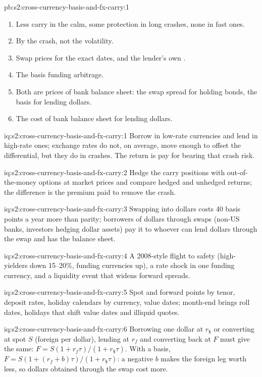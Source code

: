 \begin{solution}{pb:s2:cross-currency-basis-and-fx-carry:1}
\begin{enumerate}
\item Less carry in the calm, some protection in long crashes, none in fast ones.
\item By the crash, not the volatility.
\item Swap prices for the exact dates, and the lender's own .
\item The basis funding arbitrage.
\item Both are prices of bank balance sheet: the swap spread for holding bonds, the basis for lending dollars.
\item The cost of bank balance sheet for lending dollars.
\end{enumerate}
\end{solution}

\begin{solution}{iq:s2:cross-currency-basis-and-fx-carry:1}
Borrow in low-rate currencies and lend in high-rate ones; exchange rates do not, on average, move enough to offset the differential, but they do in
crashes. The return is pay for bearing that crash risk.
\end{solution}

\begin{solution}{iq:s2:cross-currency-basis-and-fx-carry:2}
Hedge the carry positions with out-of-the-money options at market prices and compare hedged and unhedged returns; the difference is the premium paid
to remove the crash.
\end{solution}

\begin{solution}{iq:s2:cross-currency-basis-and-fx-carry:3}
Swapping into dollars costs 40 basis points a year more than parity; borrowers of dollars through swaps (non-US banks, investors hedging dollar
assets) pay it to whoever can lend dollars through the swap and has the balance sheet.
\end{solution}

\begin{solution}{iq:s2:cross-currency-basis-and-fx-carry:4}
A 2008-style flight to safety (high-yielders down 15--20\%, funding currencies up), a rate shock in one funding currency, and a liquidity event that
widens forward spreads.
\end{solution}

\begin{solution}{iq:s2:cross-currency-basis-and-fx-carry:5}
Spot and forward points by tenor, deposit rates, holiday calendars by currency, value dates; month-end brings roll dates, holidays that shift value
dates and illiquid quotes.
\end{solution}

\begin{solution}{iq:s2:cross-currency-basis-and-fx-carry:6}
Borrowing one dollar at $r_\$$ or converting at spot $S$ (foreign per dollar), lending at $r_f$ and converting back at $F$ must give the same:
$F = S(1 + r_f\tau)/(1 + r_\$\tau)$. With a basis, $F = S(1 + (r_f + b)\tau)/(1 + r_\$\tau)$: a negative $b$ makes the foreign leg worth less, so dollars
obtained through the swap cost more.
\end{solution}
